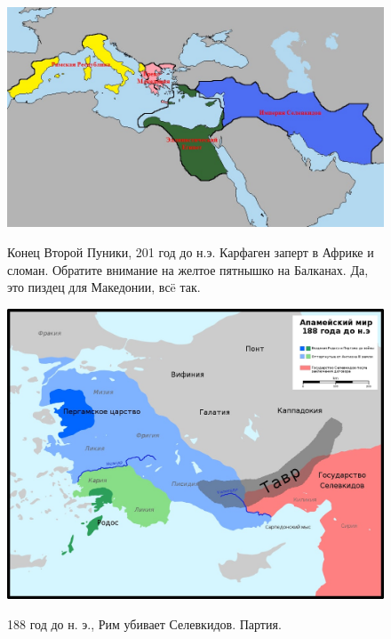 \begin{figure}[h!tb]
	\centering\includegraphics[scale=0.3]{regional_hehemons/1613656424143275900.png}
	\label{fig:heh8} %
	\caption{Конец Второй Пуники, 201 год до н.э. Карфаген заперт в Африке и сломан. Обратите внимание на желтое пятнышко на Балканах. Да, это пиздец для Македонии, всë так.  }
\end{figure}
\begin{figure}[h!tb]
	\centering\includegraphics[scale=0.4]{regional_hehemons/1613656445174137735.png}
	\label{fig:heh9} %
	\caption{188 год до н. э., Рим убивает Селевкидов. Партия.  }
\end{figure}
